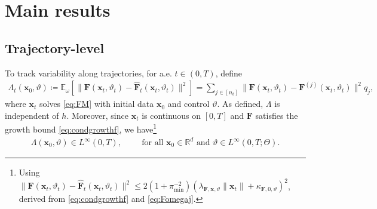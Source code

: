 \documentclass[twoside,11pt]{article}
\theoremstyle{plain}
\def\R{\mathbb R}
\def\E{\mathbb E}
\newcommand{\bff}{\mathbf{f}}
\newcommand{\bfF}{\mathbf{F}}
\newcommand{\bfx}{\mathbf{x}}
\begin{document}
 

\section{Main results}\label{sec:mainresults}

\subsection{Trajectory-level}\label{sec:convergence_dynamics}

To track variability along trajectories, for a.e. $t\in(0,T)$, define
\begin{align}\label{def:Lambda}
\Lambda_t(\bfx_0,\vartheta)\coloneqq\E_{\omega}\left[\|\bfF(\bfx_t,\vartheta_t)-\hat{\bfF}_t(\bfx_t,\vartheta_t)\|^2\right]=\sum_{j\in[n_b]}\big\|\bfF(\bfx_t,\vartheta_t)-\bfF^{(j)}(\bfx_t,\vartheta_t)\big\|^2 q_j,
\end{align}
where $\bfx_t$ solves \eqref{eq:FM} with initial data $\bfx_0$ and control $\vartheta$. As defined, $\Lambda$ is independent of $h$. Moreover, since $\bfx_t$ is continuous on $[0,T]$ and $\bfF$ satisfies the growth bound \eqref{eq:condgrowthf}, we have\footnote{Using $\|\bfF(\bfx_t,\vartheta_t)-\hat{\bfF}_t(\bfx_t,\vartheta_t)\|^2\leq 2\left(1+\pi_{\min}^{-2}\right)(\lambda_{\bfF,\bfx,\vartheta}\|\bfx_t\|+\kappa_{\bfF,0,\vartheta})^2$, derived from \eqref{eq:condgrowthf} and \eqref{eq:Fomegaj}.}
\begin{align}\label{eq: uniform_bound_Lambda}
\Lambda(\bfx_0,\vartheta)\in L^\infty(0,T),\hspace{1cm}\text{for all }\bfx_0\in\R^d\text{ and } \vartheta\in L^\infty(0,T;\Theta).
\end{align}
\end{document}
